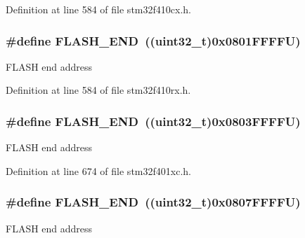 Definition at line 584 of file stm32f410cx.\+h.

\subsubsection[{\texorpdfstring{F\+L\+A\+S\+H\+\_\+\+E\+ND}{FLASH_END}}]{\setlength{\rightskip}{0pt plus 5cm}\#define F\+L\+A\+S\+H\+\_\+\+E\+ND~((uint32\+\_\+t)0x0801\+F\+F\+F\+F\+U)}\hypertarget{group___peripheral__registers__structures_ga8be554f354e5aa65370f6db63d4f3ee4}{}\label{group___peripheral__registers__structures_ga8be554f354e5aa65370f6db63d4f3ee4}
F\+L\+A\+SH end address 

Definition at line 584 of file stm32f410rx.\+h.

\subsubsection[{\texorpdfstring{F\+L\+A\+S\+H\+\_\+\+E\+ND}{FLASH_END}}]{\setlength{\rightskip}{0pt plus 5cm}\#define F\+L\+A\+S\+H\+\_\+\+E\+ND~((uint32\+\_\+t)0x0803\+F\+F\+F\+F\+U)}\hypertarget{group___peripheral__registers__structures_ga8be554f354e5aa65370f6db63d4f3ee4}{}\label{group___peripheral__registers__structures_ga8be554f354e5aa65370f6db63d4f3ee4}
F\+L\+A\+SH end address 

Definition at line 674 of file stm32f401xc.\+h.

\subsubsection[{\texorpdfstring{F\+L\+A\+S\+H\+\_\+\+E\+ND}{FLASH_END}}]{\setlength{\rightskip}{0pt plus 5cm}\#define F\+L\+A\+S\+H\+\_\+\+E\+ND~((uint32\+\_\+t)0x0807\+F\+F\+F\+F\+U)}\hypertarget{group___peripheral__registers__structures_ga8be554f354e5aa65370f6db63d4f3ee4}{}\label{group___peripheral__registers__structures_ga8be554f354e5aa65370f6db63d4f3ee4}
F\+L\+A\+SH end address 


